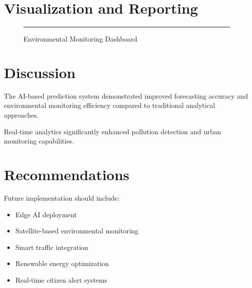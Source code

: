 \documentclass[12pt,a4paper]{article}
\begin{document}
	
	\section{Visualization and Reporting}
	
	\begin{figure}[h]
		
		\centering
		
		\rule{12cm}{6cm}
		
		\caption{Environmental Monitoring Dashboard}
		
	\end{figure}
	
	
	\section{Discussion}
	
	The AI-based prediction system demonstrated improved forecasting accuracy and environmental monitoring efficiency compared to traditional analytical approaches.
	
	Real-time analytics significantly enhanced pollution detection and urban monitoring capabilities.
	
	
	\section{Recommendations}
	
	Future implementation should include:
	
	\begin{itemize}
		
		\item Edge AI deployment
		
		\item Satellite-based environmental monitoring
		
		\item Smart traffic integration
		
		\item Renewable energy optimization
		
		\item Real-time citizen alert systems
		
	\end{itemize}
	
\end{document}

